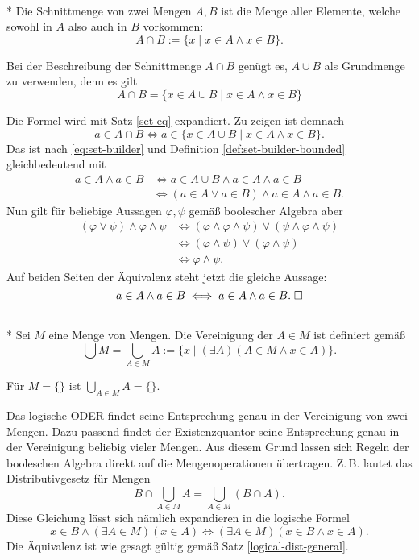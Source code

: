 \begin{Definition}[Schnittmenge]%
\mbox{}\\*
Die Schnittmenge von zwei Mengen $A,B$ ist die Menge aller Elemente,
welche sowohl in $A$ also auch in $B$ vorkommen:
\[A\cap B := \{x\mid x\in A\land x\in B\}.\]
\end{Definition}
\begin{Satz}
Bei der Beschreibung der Schnittmenge $A\cap B$ genügt es, $A\cup B$ als Grundmenge
zu verwenden, denn es gilt
\[A\cap B = \{x\in A\cup B\mid x\in A\land x\in B\}\]
\end{Satz}
Die Formel wird mit Satz \ref{set-eq} expandiert. Zu zeigen ist demnach
\[a\in A\cap B\iff a\in \{x\in A\cup B\mid x\in A\land x\in B\}.\]
Das ist nach \eqref{eq:set-builder} und Definition
\ref{def:set-builder-bounded} gleichbedeutend mit
\begin{align*}
a\in A\land a\in B&\iff a\in A\cup B\land a\in A\land a\in B\\
&\iff (a\in A\lor a\in B)\land a\in A\land a\in B.
\end{align*}
Nun gilt für beliebige Aussagen $\varphi,\psi$ gemäß boolescher Algebra aber
\begin{align*}
(\varphi\lor\psi)\land\varphi\land\psi
&\iff (\varphi\land\varphi\land\psi)\lor(\psi\land\varphi\land\psi)\\
&\iff (\varphi\land\psi)\lor(\varphi\land\psi)\\
&\iff \varphi\land\psi.
\end{align*}
Auf beiden Seiten der Äquivalenz steht jetzt die gleiche Aussage:%
\[a\in A\land a\in B\iff a\in A\land a\in B.\;\Box\]

\begin{Definition}\mbox{}\\*
Sei $M$ eine Menge von Mengen. Die Vereinigung der $A\in M$ ist
definiert gemäß
\[\bigcup M = \bigcup_{A\in M} A := \{x\mid (\exists A)(A\in M\land x\in A)\}.\]
\end{Definition}
Für $M=\{\}$ ist $\bigcup_{A\in M} A = \{\}$.

Das logische ODER findet seine Entsprechung genau in der Vereinigung
von zwei Mengen. Dazu passend findet der Existenzquantor seine
Entsprechung genau in der Vereinigung beliebig vieler Mengen.
Aus diesem Grund lassen sich Regeln der booleschen Algebra direkt
auf die Mengenoperationen übertragen. Z.\,B. lautet das
Distributivgesetz für Mengen
\[B\cap\bigcup_{A\in M} A = \bigcup_{A\in M}(B\cap A).\]
Diese Gleichung lässt sich nämlich expandieren in die logische Formel
\[x\in B\land(\exists A\in M)(x\in A) \iff (\exists A\in M)(x\in B\land x\in A).\]
Die Äquivalenz ist wie gesagt gültig gemäß Satz
\ref{logical-dist-general}.

